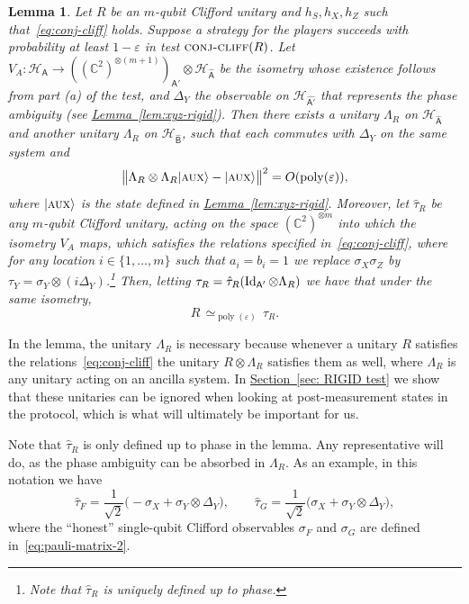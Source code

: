 \documentclass[11pt]{article}
\numberwithin{equation}{section}
\newtheorem{lemma}[theorem]{Lemma}
\theoremstyle{definition}
\theoremstyle{plain}
\newcommand{\C}{\mathbb C}
\newcommand{\expref}[2]{\hyperref[#2]{#1~\ref{#2}}}
\newcommand{\ket}[1]{|#1\rangle}
\newcommand{\Id}{\ensuremath{\mathop{\rm Id}\nolimits}}
\DeclareMathOperator{\poly}{poly}
\newcommand{\reg}[1]{{\textsf{#1}}}
\newcommand{\mH}{\mathcal{H}}
\newcommand{\eps}{\varepsilon}
\newcommand{\aux}{\textsc {aux}}
\newcommand{\conjc}{\textsc{conj-cliff}}
\newcommand{\phase}{\Lambda}
\begin{document}
\begin{lemma}\label{lem:cliff-conj}
Let $R$ be an $m$-qubit Clifford unitary and $h_S,h_X,h_Z$ such that~\eqref{eq:conj-cliff} holds. Suppose a strategy for the players succeeds with probability at least $1-\eps$ in test $\conjc(R)$. Let $V_A:\mH_\reg{A} \to ((\C^2)^{\otimes (m+1)})_{\reg{A}'}  \otimes {\mH}_{\hat{\reg{A}}}$ be the isometry whose existence follows from part (a) of the test, and $\Delta_Y$ the observable on $\mH_{\hat{\reg{A}'}}$ that represents the phase ambiguity (see \expref{Lemma}{lem:xyz-rigid}). 
Then there exists a unitary $\phase_R$ on ${\mH}_{\hat{\reg{A}}}$ and another unitary $\phase_R$ on ${\mH}_{\hat{\reg{B}}}$, such that each commutes with $\Delta_Y$ on the same system and
\begin{equation}\label{eq:r-stab}
 \big\|\phase_R \otimes \phase_R \ket{\aux} - \ket{\aux} \big\|^2 = O(\poly(\eps)),
\end{equation}
where $\ket{\aux}$ is the state defined in \expref{Lemma}{lem:xyz-rigid}.
Moreover, let $\hat{\tau}_R$ be any $m$-qubit Clifford unitary, acting on the space $(\C^2)^{\otimes m}$ into which the isometry $V_A$ maps, which satisfies the relations specified in~\eqref{eq:conj-cliff}, where for any location $i\in\{1,\ldots,m\}$ such that $a_i=b_i=1$ we replace $\sigma_X\sigma_Z$ by $\tau_Y = \sigma_Y \otimes (i\Delta_Y)$.\footnote{Note that $\hat{\tau}_R$ is uniquely defined up to phase.} Then, letting  $ \tau_R = \hat{\tau}_{R}(\Id_{\reg{A}'} \otimes \phase_R)$ we have that  under the same isometry,
$$R \,\simeq_{\poly(\eps)}\, \tau_R.$$
\end{lemma}

In the lemma, the unitary $\Lambda_R$ is necessary because whenever a unitary $R$ satisfies the relations~\eqref{eq:conj-cliff} the unitary $R\otimes \Lambda_R$ satisfies them as well, where $\Lambda_R$ is any unitary acting on an ancilla system. In \expref{Section}{sec: RIGID test} we show that these unitaries can be ignored when looking at post-measurement states in the protocol, which is what will ultimately be important for us.  

Note that $\hat{\tau}_R$ is only defined up to phase in the lemma. Any representative will do, as  the phase ambiguity can be absorbed in $\phase_R$. As an example, in this notation we have 
\begin{equation}\label{eq:hat-tau-def}
\hat{\tau}_F = \frac{1}{\sqrt{2}}\big(-\sigma_X + \sigma_Y \otimes \Delta_Y\big),\qquad \hat{\tau}_G = \frac{1}{\sqrt{2}}\big(\sigma_X + \sigma_Y \otimes \Delta_Y\big),
\end{equation}
where the ``honest'' single-qubit Clifford observables $\sigma_F$ and $\sigma_G$ are defined in~\eqref{eq:pauli-matrix-2}.
\end{document}
